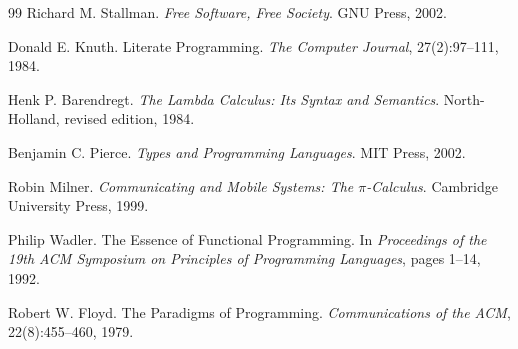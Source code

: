 \documentclass[12pt]{article}
\theoremstyle{definition}
\begin{document}
\begin{thebibliography}{99}
Richard M. Stallman.
\newblock \emph{Free Software, Free Society}.
\newblock GNU Press, 2002.

Donald E. Knuth.
\newblock Literate Programming.
\newblock \emph{The Computer Journal}, 27(2):97--111, 1984.

Henk P. Barendregt.
\newblock \emph{The Lambda Calculus: Its Syntax and Semantics}.
\newblock North-Holland, revised edition, 1984.

Benjamin C. Pierce.
\newblock \emph{Types and Programming Languages}.
\newblock MIT Press, 2002.

Robin Milner.
\newblock \emph{Communicating and Mobile Systems: The $\pi$-Calculus}.
\newblock Cambridge University Press, 1999.

Philip Wadler.
\newblock The Essence of Functional Programming.
\newblock In \emph{Proceedings of the 19th ACM Symposium on Principles of
  Programming Languages}, pages 1--14, 1992.

Robert W. Floyd.
\newblock The Paradigms of Programming.
\newblock \emph{Communications of the ACM}, 22(8):455--460, 1979.

\end{thebibliography}
\end{document}
